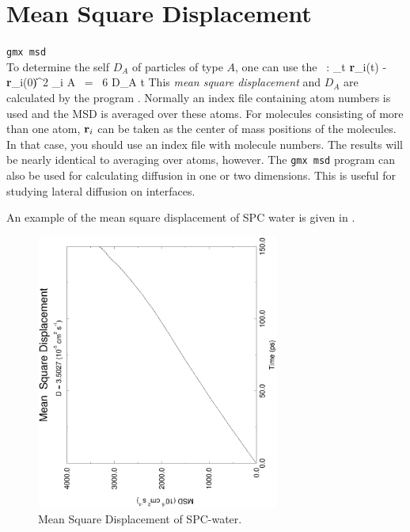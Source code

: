 \section{Mean Square Displacement}
\label{sec:msd}
{\tt gmx msd}\\
To determine the self  $D_A$ of
particles of type $A$, one can use the ~\cite{Allen87}:
\beq 
\lim_{t \rightarrow \infty} \langle
\|{\bf r}_i(t) - {\bf r}_i(0)\|^2 \rangle_{i \in A} ~=~ 6 D_A t 
\eeq
This {\em mean square displacement} and $D_A$ are calculated by the
program {\tt {}}. Normally an index file containing
atom numbers is used and the MSD is averaged over these atoms.  For
molecules consisting of more than one atom, ${\bf r}_i$ can be taken
as the center of mass positions of the molecules. In that case, you
should use an index file with molecule numbers. The results will be
nearly identical to averaging over atoms, however. The {\tt gmx msd}
program can
also be used for calculating diffusion in one or two dimensions. This
is useful for studying lateral diffusion on interfaces.

An example of the mean square displacement of SPC water is given in
.

\begin{figure}
\centerline{
{\includegraphics[width=8cm]{plots/msdwater}}}
\caption{Mean Square Displacement of SPC-water.}
\label{fig:msdwater}
\end{figure}

% 
% 
